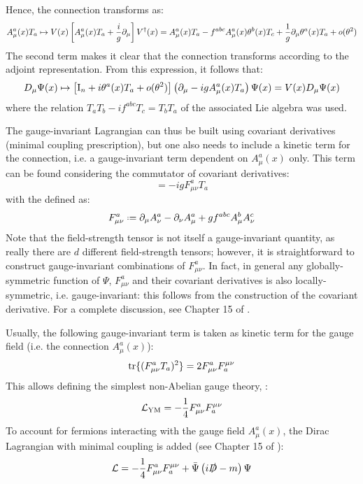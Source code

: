 Hence, the connection transforms as:
\begin{equation*}
  A_\mu^a(x) T_a \mapsto V(x) \left[ A_\mu^a(x) T_a + \frac{i}{g} \partial_\mu \right] V^\dagger(x) = A_\mu^a(x) T_a - f^{abc} A_\mu^a(x) \theta^b(x) T_c + \frac{1}{g} \partial_\mu \theta^a(x) T_a + o(\theta^2)
\end{equation*}
The second term makes it clear that the connection transforms according to the adjoint representation. From this expression, it follows that:
\begin{equation*}
  D_\mu \Psi(x) \mapsto \left[ \mathrm{I}_n + i \theta^a(x) T_a + o(\theta^2) \right] \left( \partial_\mu - i g A_\mu^a(x) T_a \right) \Psi(x) = V(x) D_\mu \Psi(x)
\end{equation*}
where the relation $ T_a T_b - i f^{abc} T_c = T_b T_a $ of the associated Lie algebra was used.

The gauge-invariant Lagrangian can thus be built using covariant derivatives (minimal coupling prescription), but one also needs to include a kinetic term for the connection, i.e. a gauge-invariant term dependent on $ A_\mu^a(x) $ only. This term can be found considering the commutator of covariant derivatives:
\begin{equation}
  [D_\mu , D_\nu] = - i g F_{\mu \nu}^a T_a
\end{equation}
with the  defined as:
\begin{equation}
  F_{\mu \nu}^a \defeq \pa_\mu A_\nu^a - \pa_\nu A_\mu^a + g f^{abc} A_\mu^b A_\nu^c
  \label{eq:field-str}
\end{equation}
Note that the field-strength tensor is not itself a gauge-invariant quantity, as really there are $ d $ different field-strength tensors; however, it is straightforward to construct gauge-invariant combinations of $ F_{\mu \nu}^a $. In fact, in general any globally-symmetric function of $ \Psi $, $ F_{\mu \nu}^a $ and their covariant derivatives is also locally-symmetric, i.e. gauge-invariant: this follows from the construction of the covariant derivative. For a complete discussion, see Chapter 15 of \cite{Peskin-1995}.

Usually, the following gauge-invariant term is taken as kinetic term for the gauge field (i.e. the connection $ A_\mu^a(x) $):
\begin{equation}
  \operatorname{tr} \{(F_{\mu \nu}^a T_a)^2\} = 2 F_{\mu \nu}^a F^{\mu \nu}_a
\end{equation}
This allows defining the simplest non-Abelian gauge theory, :
\begin{equation}
  \mathcal{L}_\text{YM} = - \frac{1}{4} F_{\mu \nu}^a F^{\mu \nu}_a
\end{equation}
To account for fermions interacting with the gauge field $ A_\mu^a(x) $, the Dirac Lagrangian with minimal coupling is added (see Chapter 15 of \cite{Weinberg-1996}):
\begin{equation}
  \mathcal{L} = - \frac{1}{4} F_{\mu \nu}^a F^{\mu \nu}_a + \bar{\Psi} \left( i \slashed{D} - m \right) \Psi
  \label{eq:qcd-lag}
\end{equation}

